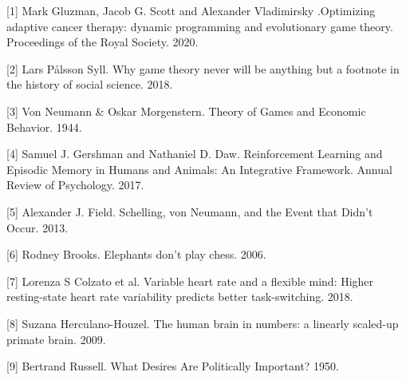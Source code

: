 \documentclass{article}
\begin{document}
\small

[1] Mark Gluzman, Jacob G. Scott and Alexander Vladimirsky .Optimizing adaptive cancer therapy: dynamic programming and evolutionary game theory. Proceedings of the Royal Society. 2020.

[2] Lars Pålsson Syll. Why game theory never will be anything but a footnote in the history of social science. 2018.

[3] Von Neumann & Oskar Morgenstern. Theory of Games and Economic Behavior. 1944.

[4] Samuel J. Gershman and Nathaniel D. Daw. Reinforcement Learning and Episodic Memory in Humans and Animals: An Integrative Framework. Annual Review of Psychology. 2017.

[5] Alexander J. Field. Schelling, von Neumann, and the Event that Didn’t Occur. 2013.

[6] Rodney Brooks. Elephants don’t play chess. 2006.

[7] Lorenza S Colzato et al. Variable heart rate and a flexible mind: Higher resting-state heart rate variability predicts better task-switching. 2018.

[8] Suzana Herculano-Houzel. The human brain in numbers: a linearly scaled-up primate brain. 2009.

[9] Bertrand Russell. What Desires Are Politically Important? 1950. 
\end{document}

